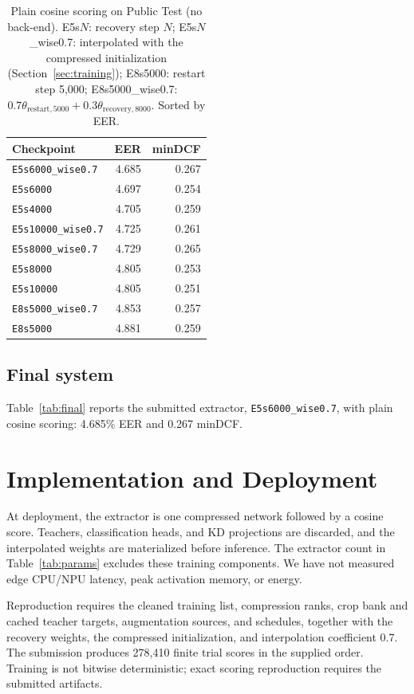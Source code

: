 \documentclass[11pt]{article}
\begin{document}
\begin{table}[t]
\centering
\small
\setlength{\tabcolsep}{3.5pt}
\begin{tabular}{@{}lrr@{}}
\toprule
Checkpoint & EER & minDCF \\
\midrule
\nolinkurl{E5s6000_wise0.7}  & 4.685 & 0.267 \\
\nolinkurl{E5s6000}          & 4.697 & 0.254 \\
\nolinkurl{E5s4000}          & 4.705 & 0.259 \\
\nolinkurl{E5s10000_wise0.7} & 4.725 & 0.261 \\
\nolinkurl{E5s8000_wise0.7}  & 4.729 & 0.265 \\
\nolinkurl{E5s8000}          & 4.805 & 0.253 \\
\nolinkurl{E5s10000}         & 4.805 & 0.251 \\
\nolinkurl{E8s5000_wise0.7}  & 4.853 & 0.257 \\
\nolinkurl{E8s5000}          & 4.881 & 0.259 \\
\bottomrule
\end{tabular}
\caption{Plain cosine scoring on Public Test (no back-end). E5s$N$: recovery step $N$; E5s$N$\_wise0.7: interpolated with the compressed initialization (Section~\ref{sec:training}); E8s5000: restart step 5,000; E8s5000\_wise0.7: $0.7\theta_{\mathrm{restart},5000}+0.3\theta_{\mathrm{recovery},8000}$. Sorted by EER.}
\label{tab:cosine}
\end{table}

\subsection{Final system}
Table~\ref{tab:final} reports the submitted extractor, \nolinkurl{E5s6000_wise0.7}, with plain cosine scoring: 4.685\% EER and 0.267 minDCF.

\section{Implementation and Deployment}
At deployment, the extractor is one compressed network followed by a cosine score. Teachers, classification heads, and KD projections are discarded, and the interpolated weights are materialized before inference. The extractor count in Table~\ref{tab:params} excludes these training components. We have not measured edge CPU/NPU latency, peak activation memory, or energy.

Reproduction requires the cleaned training list, compression ranks, crop bank and cached teacher targets, augmentation sources, and schedules, together with the recovery weights, the compressed initialization, and interpolation coefficient 0.7. The submission produces 278,410 finite trial scores in the supplied order. Training is not bitwise deterministic; exact scoring reproduction requires the submitted artifacts.
\end{document}
